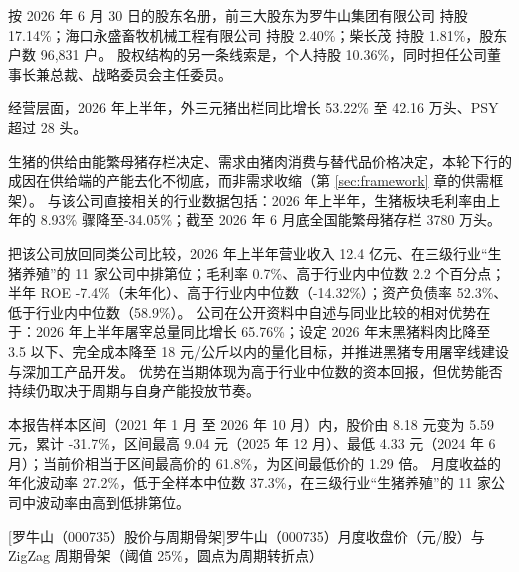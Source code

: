  按 2026 年 6 月 30 日的股东名册，前三大股东为罗牛山集团有限公司 持股 17.14\%；海口永盛畜牧机械工程有限公司 持股 2.40\%；柴长茂 持股 1.81\%，股东户数 96,831 户。 股权结构的另一条线索是，个人持股 10.36\%，同时担任公司董事长兼总裁、战略委员会主任委员。

 经营层面，2026 年上半年，外三元猪出栏同比增长 53.22\% 至 42.16 万头、PSY 超过 28 头。

 生猪的供给由能繁母猪存栏决定、需求由猪肉消费与替代品价格决定，本轮下行的成因在供给端的产能去化不彻底，而非需求收缩（第 \ref{sec:framework} 章的供需框架）。 与该公司直接相关的行业数据包括：2026 年上半年，生猪板块毛利率由上年的 8.93\% 骤降至-34.05\%；截至 2026 年 6 月底全国能繁母猪存栏 3780 万头。

 把该公司放回同类公司比较，2026 年上半年营业收入 12.4 亿元、在三级行业“生猪养殖”的 11 家公司中排第位；毛利率 0.7\%、高于行业内中位数 2.2 个百分点；半年 ROE -7.4\%（未年化）、高于行业内中位数（-14.32\%）；资产负债率 52.3\%、低于行业内中位数（58.9\%）。 公司在公开资料中自述与同业比较的相对优势在于：2026 年上半年屠宰总量同比增长 65.76\%；设定 2026 年末黑猪料肉比降至 3.5 以下、完全成本降至 18 元/公斤以内的量化目标，并推进黑猪专用屠宰线建设与深加工产品开发。 优势在当期体现为高于行业中位数的资本回报，但优势能否持续仍取决于周期与自身产能投放节奏。

 本报告样本区间（2021 年 1 月 至 2026 年 10 月）内，股价由 8.18 元变为 5.59 元，累计 -31.7\%，区间最高 9.04 元（2025 年 12 月）、最低 4.33 元（2024 年 6 月）；当前价相当于区间最高价的 61.8\%，为区间最低价的 1.29 倍。 月度收益的年化波动率 27.2\%，低于全样本中位数 37.3\%，在三级行业“生猪养殖”的 11 家公司中波动率由高到低排第位。

\begin{center}
\begin{minipage}{\textwidth}\centering
{}

[罗牛山（000735）股价与周期骨架]{罗牛山（000735）月度收盘价（元/股）与 ZigZag 周期骨架（阈值 25\%，圆点为周期转折点）}
\end{minipage}
\end{center}

